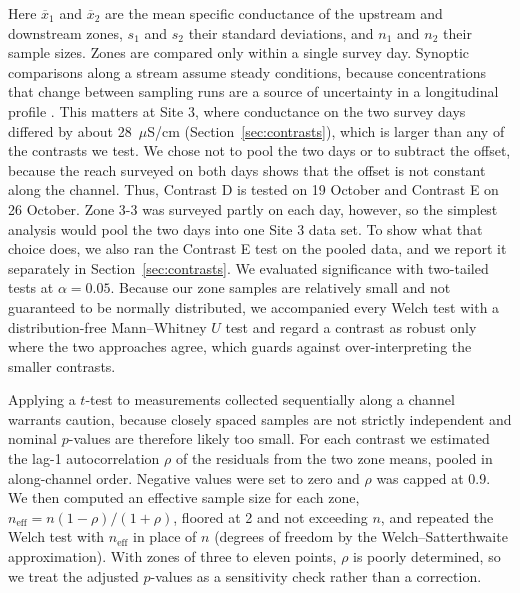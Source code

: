 \documentclass{article}
\begin{document}
Here $\overline{x}_{1}$ and $\overline{x}_{2}$ are the mean specific conductance of the upstream and downstream zones, $s_{1}$ and $s_{2}$ their standard deviations, and $n_{1}$ and $n_{2}$ their sample sizes. Zones are compared only within a single survey day. Synoptic comparisons along a stream assume steady conditions, because concentrations that change between sampling runs are a source of uncertainty in a longitudinal profile \citep{runkel2013}. This matters at Site 3, where conductance on the two survey days differed by about 28~$\mu$S/cm (Section~\ref{sec:contrasts}), which is larger than any of the contrasts we test. We chose not to pool the two days or to subtract the offset, because the reach surveyed on both days shows that the offset is not constant along the channel. Thus, Contrast D is tested on 19 October and Contrast E on 26 October. Zone 3-3 was surveyed partly on each day, however, so the simplest analysis would pool the two days into one Site 3 data set. To show what that choice does, we also ran the Contrast E test on the pooled data, and we report it separately in Section~\ref{sec:contrasts}. We evaluated significance with two-tailed tests at $\alpha = 0.05$. Because our zone samples are relatively small and not guaranteed to be normally distributed, we accompanied every Welch test with a distribution-free Mann--Whitney $U$ test and regard a contrast as robust only where the two approaches agree, which guards against over-interpreting the smaller contrasts.

Applying a $t$-test to measurements collected sequentially along a channel warrants caution, because closely spaced samples are not strictly independent and nominal $p$-values are therefore likely too small. For each contrast we estimated the lag-1 autocorrelation $\rho$ of the residuals from the two zone means, pooled in along-channel order. Negative values were set to zero and $\rho$ was capped at 0.9. We then computed an effective sample size for each zone, $n_{\mathrm{eff}} = n(1-\rho)/(1+\rho)$, floored at 2 and not exceeding $n$, and repeated the Welch test with $n_{\mathrm{eff}}$ in place of $n$ (degrees of freedom by the Welch--Satterthwaite approximation). With zones of three to eleven points, $\rho$ is poorly determined, so we treat the adjusted $p$-values as a sensitivity check rather than a correction.
\end{document}
